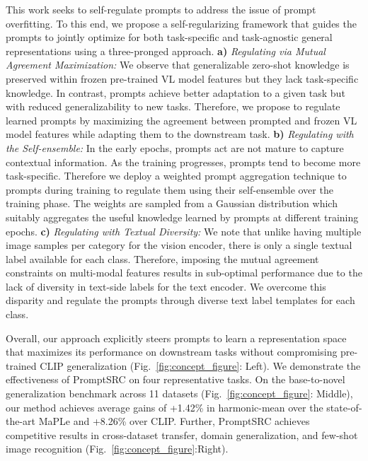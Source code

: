\documentclass[10pt,twocolumn,letterpaper]{article}
\begin{document}
This work seeks to self-regulate prompts to address the issue of prompt overfitting.  To this end, we propose a self-regularizing framework that guides the prompts to jointly optimize for both task-specific and task-agnostic general representations using a three-pronged approach. \textbf{a)} \emph{Regulating via Mutual Agreement Maximization:} We observe that generalizable zero-shot knowledge is preserved within frozen pre-trained VL model features but they lack task-specific knowledge. In contrast, prompts achieve better adaptation to a given task but with reduced generalizability to new tasks. Therefore, we propose to regulate learned prompts by maximizing the agreement between prompted and frozen VL model features while adapting them to the downstream task. \textbf{b)} \emph{Regulating with the Self-ensemble:} In the early epochs, prompts act are not mature to capture contextual information. As the training progresses, prompts tend to become more task-specific. Therefore we deploy a weighted prompt aggregation technique to prompts during training to regulate them using their self-ensemble over the training phase. The weights are sampled from a Gaussian distribution which suitably aggregates the useful knowledge learned by prompts at different training epochs. \textbf{c)} \emph{Regulating with Textual Diversity:} We note that unlike having multiple image samples per category for the vision encoder, there is only a single textual label available for each class. Therefore, imposing the mutual agreement constraints on multi-modal features results in sub-optimal performance due to the lack of diversity in text-side labels for the text encoder. We overcome this disparity and regulate the prompts through diverse text label templates for each class.


Overall, our approach explicitly steers prompts to learn a representation space that maximizes its performance on downstream tasks without compromising pre-trained CLIP generalization (Fig.~\ref{fig:concept_figure}: Left). We demonstrate the effectiveness of PromptSRC on four representative tasks. On the base-to-novel generalization benchmark across 11 datasets (Fig.~\ref{fig:concept_figure}: Middle), our method achieves average gains of +1.42\% in harmonic-mean over the state-of-the-art MaPLe \cite{khattak2023maple} and +8.26\% over CLIP. {Further, PromptSRC achieves competitive results in cross-dataset transfer, domain generalization, and few-shot image recognition (Fig.~\ref{fig:concept_figure}:Right)}. 
\end{document}
